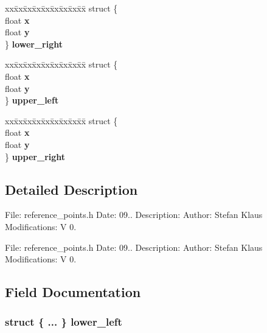 \begin{DoxyCompactItemize}
\begin{tabbing}
\end{tabbing}\item 
\begin{tabbing}
xx\=xx\=xx\=xx\=xx\=xx\=xx\=xx\=xx\=\kill
struct \{\\
\>float {\bf x}\\
\>float {\bf y}\\
\} {\bf lower\_right}\\

\end{tabbing}\item 
\begin{tabbing}
xx\=xx\=xx\=xx\=xx\=xx\=xx\=xx\=xx\=\kill
struct \{\\
\>float {\bf x}\\
\>float {\bf y}\\
\} {\bf upper\_left}\\

\end{tabbing}\item 
\begin{tabbing}
xx\=xx\=xx\=xx\=xx\=xx\=xx\=xx\=xx\=\kill
struct \{\\
\>float {\bf x}\\
\>float {\bf y}\\
\} {\bf upper\_right}\\

\end{tabbing}\end{DoxyCompactItemize}


\subsection{Detailed Description}
File\-: reference\-\_\-points.\-h Date\-: 09.. Description\-: Author\-: Stefan Klaus Modifications\-: V 0.

File\-: reference\-\_\-points.\-h Date\-: 09.. Description\-: Author\-: Stefan Klaus Modifications\-: V 0. 

\subsection{Field Documentation}
\subsubsection[{lower\-\_\-left}]{\setlength{\rightskip}{0pt plus 5cm}struct \{ ... \}   lower\-\_\-left}\label{structreference_pos_a54d5df461a75155dd817374a73938caf}
